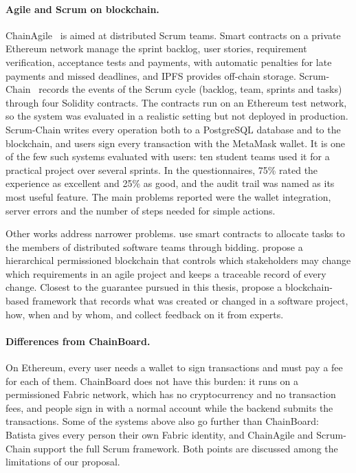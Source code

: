 \paragraph*{Agile and Scrum on blockchain.} ChainAgile~\cite{qureshi2024chainagile} is aimed at distributed Scrum teams. Smart contracts on a private Ethereum network manage the sprint backlog, user stories, requirement verification, acceptance tests and payments, with automatic penalties for late payments and missed deadlines, and IPFS provides off-chain storage. Scrum-Chain~\cite{silva_scrumchain} records the events of the Scrum cycle (backlog, team, sprints and tasks) through four Solidity contracts. The contracts run on an Ethereum test network, so the system was evaluated in a realistic setting but not deployed in production. Scrum-Chain writes every operation both to a PostgreSQL database and to the blockchain, and users sign every transaction with the MetaMask wallet. It is one of the few such systems evaluated with users: ten student teams used it for a practical project over several sprints. In the questionnaires, 75\% rated the experience as excellent and 25\% as good, and the audit trail was named as its most useful feature. The main problems reported were the wallet integration, server errors and the number of steps needed for simple actions.

Other works address narrower problems. \textcite{gupta2021allocation} use smart contracts to allocate tasks to the members of distributed software teams through bidding. \textcite{rocky2021requirements} propose a hierarchical permissioned blockchain that controls which stakeholders may change which requirements in an agile project and keeps a traceable record of every change. Closest to the guarantee pursued in this thesis, \textcite{demi2024traceability} propose a blockchain-based framework that records what was created or changed in a software project, how, when and by whom, and collect feedback on it from experts.

\paragraph*{Differences from ChainBoard.} On Ethereum, every user needs a wallet to sign transactions and must pay a fee for each of them. ChainBoard does not have this burden: it runs on a permissioned Fabric network, which has no cryptocurrency and no transaction fees, and people sign in with a normal account while the backend submits the transactions. Some of the systems above also go further than ChainBoard: Batista gives every person their own Fabric identity, and ChainAgile and Scrum-Chain support the full Scrum framework. Both points are discussed among the limitations of our proposal.

